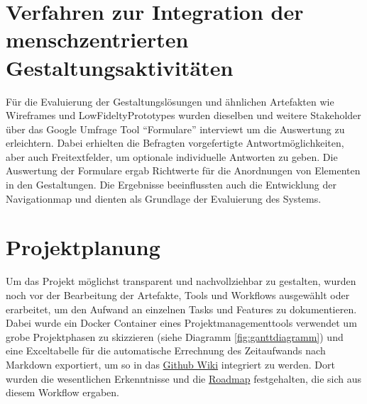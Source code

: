 \section{Verfahren zur Integration der menschzentrierten Gestaltungsaktivitäten}     
Für die Evaluierung der Gestaltungslösungen und ähnlichen Artefakten wie Wireframes und LowFideltyPrototypes wurden dieselben und weitere Stakeholder über das Google Umfrage Tool {``Formulare''} interviewt um die Auswertung zu erleichtern. Dabei erhielten die Befragten vorgefertigte Antwortmöglichkeiten, aber auch Freitextfelder, um optionale individuelle Antworten zu geben. Die Auswertung der Formulare ergab Richtwerte für die Anordnungen von Elementen in den Gestaltungen. Die Ergebnisse beeinflussten auch die Entwicklung der Navigationmap und dienten als Grundlage der Evaluierung des Systems.

\section{Projektplanung}
Um das Projekt möglichst transparent und nachvollziehbar zu gestalten, wurden noch vor der Bearbeitung der Artefakte, Tools und Workflows ausgewählt oder erarbeitet, um den Aufwand an einzelnen Tasks und Features zu dokumentieren. Dabei wurde ein Docker Container eines Projektmanagementtools verwendet um grobe Projektphasen zu skizzieren (siehe Diagramm \ref{fig:ganttdiagramm}) und eine Exceltabelle für die automatische Errechnung des Zeitaufwands nach Markdown exportiert, um so in das \href{https://github.com/Inf166/design-concept-sharing-recipies/wiki}{Github Wiki} integriert zu werden. Dort wurden die wesentlichen Erkenntnisse und die \href{https://github.com/Inf166/design-concept-sharing-recipies/wiki/Roadmap}{Roadmap} festgehalten, die sich aus diesem Workflow ergaben.\\

